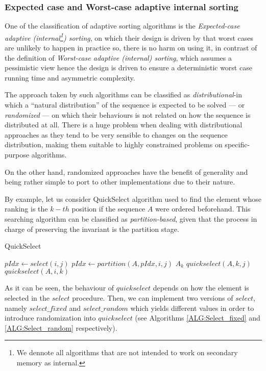 \subsubsection{Expected case and Worst-case adaptive internal sorting}
One of the classification of adaptive sorting algorithms is the \textit{Expected-case adaptive (internal\footnote{We dennote all algorithms that are not intended to work on secondary memory as internal.}) sorting}, on which their design is driven by that worst cases are unlikely to happen in practice so, there is no harm on using it, in contrast of the definition of \textit{Worst-case adaptive (internal) sorting}, which assumes a pessimistic view hence the design is driven to ensure a deterministic worst case running time and asymmetric complexity.

The approach taken by such algorithms can be classified as \textit{distributional}-in which a ``natural distribution'' of the sequence is expected to be solved --- or \textit{randomized} --- on which their behaviours is not related on how the sequence is distributed at all. There is a huge problem when dealing with distributional approaches as they tend to be very sensible to changes on the sequence distribution, making them suitable to highly constrained problems on specific-purpose algorithms.

On the other hand, randomized approaches have the benefit of generality and being rather simple to port to other implementations due to their nature.

By example, let us consider QuickSelect algorithm used to find the element whose ranking is the $k-th$ position if the sequence $A$ were ordered beforehand. This searching algorithm can be classified as \textit{partition-based}, given that the process in charge of preserving the invariant is the partition stage.


\begin{algorithm}
  \caption{QuickSelect}\label{ALG:QuickSelect}
  \begin{algorithmic}[1]
    \State $pIdx \gets select(i,j)$
    \State $pIdx \gets partition(A,pIdx,i,j)$
     \Return $A_k$
    \EndIf
     \Return $quickselect(A, k, j)$
    \EndIf
     \Return $quickselect(A, i, k)$
    \EndIf
    \EndProcedure
  \end{algorithmic}
\end{algorithm}

As it can be seen, the behaviour of $quickselect$ depends on how the element is selected in the $select$ procedure. Then, we can implement two versions of $select$, namely $select\_fixed$ and $select\_random$ which yields different values in order to introduce randomization into $quickselect$ (see Algorithms \ref{ALG:Select_fixed} and \ref{ALG:Select_random} respectively).

